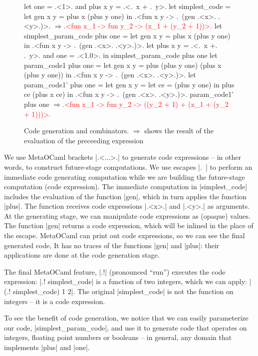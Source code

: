 \documentclass{llncs}
\newcommand{\evalresult}[1]{\ensuremath{\Longrightarrow}\textcolor{red}{#1}}
\begin{document}
\begin{figure*}
\begin{code}
let one = .<1>. and plus x y = .<.~x + .~y>.
let simplest_code = let gen x y = plus x (plus y one) in
  .<fun x y -> .~(gen .<x>. .<y>.)>.
\evalresult{.<fun x_1 -> fun y_2 -> (x_1 + (y_2 + 1))>.}
let simplest_param_code plus one = let gen x y = plus x (plus y one) in
  .<fun x y -> .~(gen .<x>. .<y>.)>.
let plus x y = .<.~x +. .~y>. and one = .<1.0>. in
  simplest_param_code plus one
let param_code1 plus one =
  let gen x y = plus (plus y one) (plus x (plus y one)) in
  .<fun x y -> .~(gen .<x>. .<y>.)>.
let param_code1' plus one =
  let gen x y = let ce = (plus y one) in  plus ce (plus x ce) in
  .<fun x y -> .~(gen .<x>. .<y>.)>.
param_code1' plus one
\evalresult{.<fun x_1 -> fun y_2 -> ((y_2 + 1) + (x_1 + (y_2 + 1)))>.}
\end{code}
\caption{Code generation and combinators. $\Longrightarrow$ shows the
  result of the evaluation of the preceeding expression}
\end{figure*}

We use MetaOCaml brackets |.<...>.| to generate code expressions -- in
other words, to construct future-stage computations. We use escapes
|.~| to perform an immediate code generating computation while we are
building the future-stage computation (code expression). The immediate
computation in |simplest_code| includes the evaluation of the function
|gen|, which in turn applies the function |plus|. The function
receives code expressions |.<x>.| and |.<y>.| as arguments. At the
generating stage, we can manipulate code expressions as (opaque)
values. The function |gen| returns a code expression, which will be
inlined in the place of the escape. MetaOCaml can print out code
expressions, so we can see the final generated code, It has
no traces of the functions |gen| and |plus|: their applications are
done at the code generation stage. 

The final MetaOCaml feature, |.!| (pronounced ``run'') 
executes the code expression: |.! simplest_code| is a function of two
integers, which we can apply: |(.! simplest_code) 1 2|. The original
|simplest_code| is not the function on integers -- it is a code
expression.

To see the benefit of code generation, we notice that we can easily
parameterize our code, |simplest_param_code|, and use it to generate
code that operates on integers, floating point numbers or booleans --
in general, any domain that implements |plus| and |one|.
\end{document}
